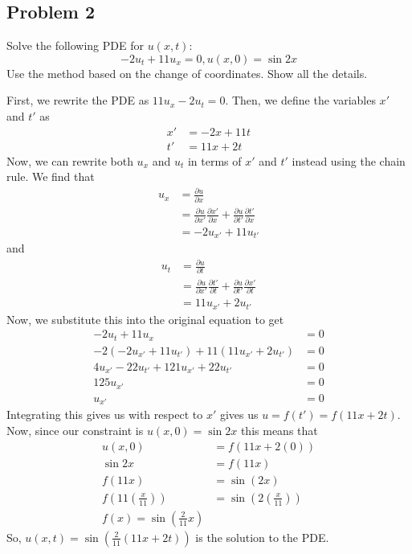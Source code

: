 \documentclass{ben}
\begin{document}
\subsection{Problem 2}
\noindent
Solve the following PDE for $u(x, t)$:
\[
-2u_t + 11u_x = 0, u(x, 0) = \sin 2x
\]
Use the method based on the change of coordinates. Show all the details.
\begin{solution}
    First, we rewrite the PDE as $11u_x - 2u_t = 0$. Then, we define the variables
    $x'$ and $t'$ as
    \begin{align*}
        x' &= -2x + 11t\\
        t' &= 11x + 2t
    \end{align*} 
    Now, we can rewrite both $u_x$ and $u_t$ in terms of $x'$ and $t'$ instead using the chain rule.
    We find that
    \begin{align*} 
        u_x &= \frac{\partial u}{\partial x}\\
        &= \frac{\partial u}{\partial x'} \frac{\partial x'}{\partial x}
        + \frac{\partial u}{\partial t'}\frac{\partial t'}{\partial x}\\
        &= -2 u_{x'} + 11 u_{t'}
    \end{align*}
    and
    \begin{align*} 
        u_t &= \frac{\partial u}{\partial t}\\
        &= \frac{\partial u}{\partial x'} \frac{\partial t'}{\partial t}
        + \frac{\partial u}{\partial t'}\frac{\partial x'}{\partial t}\\
        &= 11 u_{x'} + 2 u_{t'}
    \end{align*}
    Now, we substitute this into the original equation to get
    \begin{align*}
        -2 u_t + 11 u_x &= 0\\
        -2 \left( -2 u_{x'} + 11 u_{t'} \right) + 11 \left( 11 u_{x'} + 2 u_{t'} \right) &= 0\\
        4 u_{x'} - 22 u_{t'} + 121 u_{x'} + 22 u_{t'} &= 0\\
        125 u_{x'} &= 0\\
        u_{x'} &= 0
    \end{align*}
    Integrating this gives us with respect to $x'$ gives us $u = f(t') = f(11x + 2t)$.
    Now, since our constraint is $u(x, 0) = \sin 2x$ this means that
    \begin{align*}
       u(x, 0) &= f(11x + 2(0))\\
       \sin 2x &= f(11x)\\
       f(11x) &= \sin(2x)\\
       f \left( 11 \left( \frac{x}{11} \right) \right) &=
       \sin \left( 2 \left( \frac{x}{11} \right) \right)\\
       f(x) = \sin\left(\frac{2}{11}x\right)
    \end{align*}
    So, $u(x, t) = \sin\left(\frac{2}{11}\left(11x + 2t\right)\right)$ is the solution to the PDE.
\end{solution}
\end{document}
